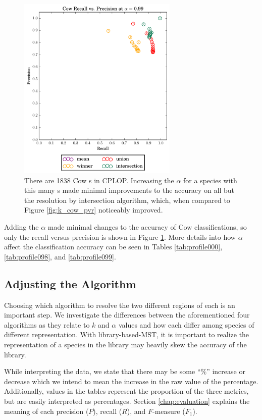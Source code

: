 \begin{figure}[t]
\centering
\includegraphics[width=3in]{figures/krap/Cow-ALL-pvr-12-0_990}
\caption{There are 1838 Cow \isol{}s in CPLOP. Increasing the $\alpha$ for a species with this many \isol{}s made minimal improvements to the accuracy on all but the resolution by intersection algorithm, which, when compared to Figure \ref{fig:k_cow_pvr} noticeably improved.}
\label{fig:alpha_cow_pvr}
\end{figure}

Adding the $\alpha$ made minimal changes to the accuracy of Cow classifications, so only the recall versus precision is shown in Figure \ref{fig:alpha_cow_pvr}. More details into how $\alpha$ affect the classification accuracy can be seen in Tables \ref{tab:profile000}, \ref{tab:profile098}, and \ref{tab:profile099}.

\subsection{Adjusting the Algorithm}
Choosing which algorithm to resolve the two different regions of each \isol{} is an important step. We investigate the differences between the aforementioned four algorithms as they relate to $k$ and $\alpha$ values and how each differ among species of different representation. With library-based-MST, it is important to realize the representation of a species in the library may heavily skew the accuracy of the library.

While interpreting the data, we state that there may be some ``\%'' increase or decrease which we intend to mean the increase in the raw value of the percentage. Additionally, values in the tables represent the proportion of the three metrics, but are easily interpreted as percentages. Section \ref{chap:evaluation} explains the meaning of each precision ($P$), recall ($R$), and $F$-measure ($F_1$).

